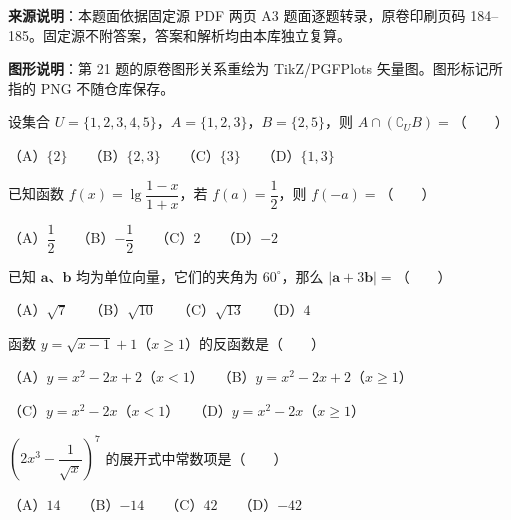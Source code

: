 


\begin{gktip}
\textbf{来源说明}：本题面依据固定源 PDF 两页 A3 题面逐题转录，原卷印刷页码 184–185。固定源不附答案，答案和解析均由本库独立复算。

\textbf{图形说明}：第 21 题的原卷图形关系重绘为 TikZ/PGFPlots 矢量图。图形标记所指的 PNG 不随仓库保存。
\end{gktip}


\begin{question}
设集合 $U=\{1,2,3,4,5\}$，$A=\{1,2,3\}$，$B=\{2,5\}$，则 $A\cap(\complement_U B)=$\mbox{（　　）}

（A）$\{2\}$　　（B）$\{2,3\}$　　（C）$\{3\}$　　（D）$\{1,3\}$

\end{question}
\begin{question}
已知函数 $f(x)=\lg\dfrac{1-x}{1+x}$，若 $f(a)=\dfrac12$，则 $f(-a)=$\mbox{（　　）}

（A）$\dfrac12$　　（B）$-\dfrac12$　　（C）$2$　　（D）$-2$

\end{question}
\begin{question}
已知 $\boldsymbol a\text{、}\boldsymbol b$ 均为单位向量，它们的夹角为 $60^\circ$，那么 $|\boldsymbol a+3\boldsymbol b|=$\mbox{（　　）}

（A）$\sqrt7$　　（B）$\sqrt{10}$　　（C）$\sqrt{13}$　　（D）$4$

\end{question}
\begin{question}
函数 $y=\sqrt{x-1}+1$（$x\geqslant1$）的反函数是\mbox{（　　）}

（A）$y=x^2-2x+2$（$x<1$）　　（B）$y=x^2-2x+2$（$x\geqslant1$）

（C）$y=x^2-2x$（$x<1$）　　（D）$y=x^2-2x$（$x\geqslant1$）

\end{question}
\begin{question}
$\left(2x^3-\dfrac1{\sqrt{x}}\right)^7$ 的展开式中常数项是\mbox{（　　）}

（A）$14$　　（B）$-14$　　（C）$42$　　（D）$-42$

\end{question}
